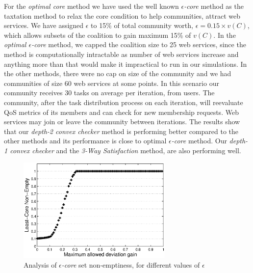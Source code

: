\documentclass[10pt,journal,cspaper,compsoc]{IEEEtran}
\begin{document}
For the \emph{optimal core} method we have used the well known \emph{$\epsilon$-core} method as the
taxtation method to relax the core condition to help communities, attract web services.
We have assigned $\epsilon$ to 15\% of total community worth, $\epsilon = 0.15 \times v(C)$, which allows
subsets of the coalition to gain maximum 15\% of $v(C)$. In the
\emph{optimal $\epsilon$-core} method, we capped the coalition
size to 25 web services, since the method is computationally
intractable as number of web services increase and anything more than that would make it
impractical to run in our simulations. In the other methods, there
were no cap on size of the community and we had communities of
size 60 web services at some points. In this scenario our community receives 30 tasks on average per iteration, from users. The community, after the task distribution process on each iteration, will reevaluate QoS metrics of its members and can check for new membership requests. Web services may join or leave the community between iterations. The results show that our
\emph{depth-2 convex checker} method is performing better compared
to the other methods and its performance is close to optimal
\emph{$\epsilon$-core} method. Our \emph{depth-1 convex checker}
and the \emph{3-Way Satisfaction} method, are also performing well.


\begin{figure}[!t]
\centering
\includegraphics[width=3in]{least_core.eps}
\caption{Analysis of \emph{$\epsilon$-core} set non-emptiness, for different values of $\epsilon$} \label{f_leastcore}
\end{figure}
\end{document}

